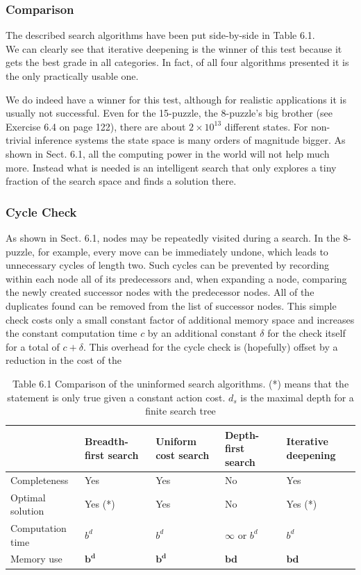 \documentclass[10pt]{book}
\begin{document}
\subsubsection*{Comparison}
The described search algorithms have been put side-by-side in Table 6.1.\\
We can clearly see that iterative deepening is the winner of this test because it gets the best grade in all categories. In fact, of all four algorithms presented it is the only practically usable one.

We do indeed have a winner for this test, although for realistic applications it is usually not successful. Even for the 15-puzzle, the 8-puzzle's big brother (see Exercise 6.4 on page 122), there are about $2 \times 10^{13}$ different states. For non-trivial inference systems the state space is many orders of magnitude bigger. As shown in Sect. 6.1, all the computing power in the world will not help much more. Instead what is needed is an intelligent search that only explores a tiny fraction of the search space and finds a solution there.

\subsubsection*{Cycle Check}
As shown in Sect. 6.1, nodes may be repeatedly visited during a search. In the 8-puzzle, for example, every move can be immediately undone, which leads to unnecessary cycles of length two. Such cycles can be prevented by recording within each node all of its predecessors and, when expanding a node, comparing the newly created successor nodes with the predecessor nodes. All of the duplicates found can be removed from the list of successor nodes. This simple check costs only a small constant factor of additional memory space and increases the constant computation time $c$ by an additional constant $\delta$ for the check itself for a total of $c+\delta$. This overhead for the cycle check is (hopefully) offset by a reduction in the cost of the

\begin{table}[htbp]
\begin{center}
\captionsetup{labelformat=empty}
\caption{Table 6.1 Comparison of the uninformed search algorithms. (*) means that the statement is only true given a constant action cost. $d_{s}$ is the maximal depth for a finite search tree}
\begin{tabular}{|l|l|l|l|l|}
\hline
 & Breadth-first search & Uniform cost search & Depth-first search & Iterative deepening \\
\hline
Completeness & Yes & Yes & No & Yes \\
\hline
Optimal solution & Yes (*) & Yes & No & Yes (*) \\
\hline
Computation time & $b^{d}$ & $b^{d}$ & $\infty$ or $b^{d}$ & $b^{d}$ \\
\hline
Memory use & $\boldsymbol{b}^{\boldsymbol{d}}$ & $\boldsymbol{b}^{\boldsymbol{d}}$ & $\boldsymbol{b} \boldsymbol{d}$ & $\boldsymbol{b} \boldsymbol{d}$ \\
\hline
\end{tabular}
\end{center}
\end{table}
\end{document}
